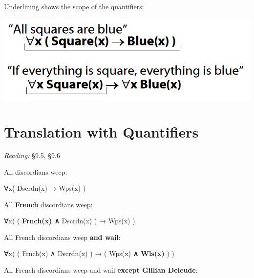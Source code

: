 \documentclass[12pt]{extarticle}
\begin{document}
\begin{multicols*}{3}
\begin{minipage}{\columnwidth}
 
Underlining shows the scope of the quantifiers:
 
\begin{center}
\includegraphics[scale=0.3]{img/scope_quantifiers.png}
\end{center}
\end{minipage}
 
 
 
\section{Translation with Quantifiers}
 
\emph{Reading:} §9.5, §9.6
 
\begin{minipage}{\columnwidth}
 
All discordians weep:
 
∀x( Dscrdn(x) → Wps(x) )
 
\end{minipage}
 
\begin{minipage}{\columnwidth}
 
All \textbf{French} discordians weep:
 
∀x( ( \textbf{Frnch(x) ∧} Dscrdn(x) ) → Wps(x) )
 
\end{minipage}
 
\begin{minipage}{\columnwidth}
 
All French discordians weep \textbf{and wail}:
 
∀x( ( Frnch(x) ∧ Dscrdn(x) ) → ( Wps(x) \textbf{ ∧ Wls(x)} ) )
 
\end{minipage}
 
\begin{minipage}{\columnwidth}
 
All French discordians weep and wail \textbf{except Gillian Deleude}:
 

\end{minipage}
\end{multicols*}
\end{document}
